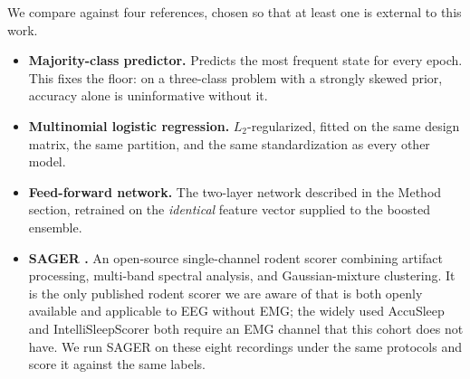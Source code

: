 We compare against four references, chosen so that at least one is
external to this work.
\begin{itemize}\itemsep2pt\parskip0pt
    \item \textbf{Majority-class predictor.} Predicts the most frequent
    state for every epoch. This fixes the floor: on a three-class problem
    with a strongly skewed prior, accuracy alone is uninformative without
    it.
    \item \textbf{Multinomial logistic regression.} $L_2$-regularized,
    fitted on the same design matrix, the same partition, and the same
    standardization as every other model.
    \item \textbf{Feed-forward network.} The two-layer network described
    in the Method section, retrained on the \emph{identical} feature
    vector supplied to the boosted ensemble.
    \item \textbf{SAGER \citep{saevskiy2025_sensors}.} An open-source
    single-channel rodent scorer combining artifact processing,
    multi-band spectral analysis, and Gaussian-mixture clustering. It is
    the only published rodent scorer we are aware of that is both openly
    available and applicable to EEG without EMG; the widely used
    AccuSleep \citep{barger2019_accusleep} and IntelliSleepScorer
    \citep{wang2023_intellisleepscorer} both require an EMG channel that
    this cohort does not have. We run SAGER on these eight recordings
    under the same protocols and score it against the same labels.
\end{itemize}

